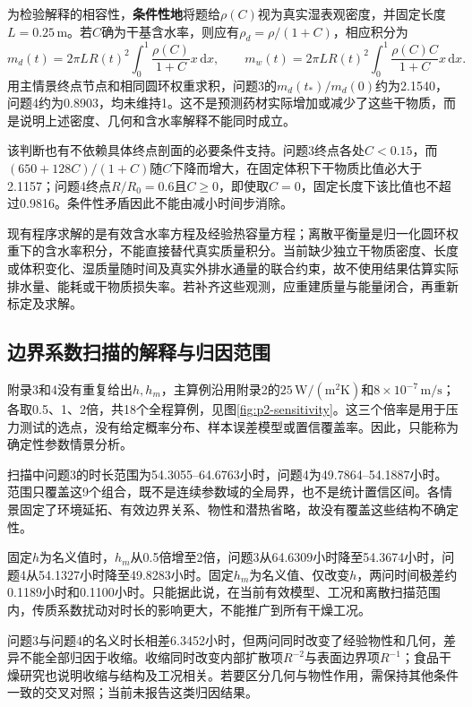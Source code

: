 \documentclass[UTF8,zihao=-4,a4paper]{ctexart}
\newcommand{\dd}{\,\mathrm d}
\begin{document}
为检验解释的相容性，\textbf{条件性地}将题给$\rho(C)$视为真实湿表观密度，并固定长度$L=0.25\,\mathrm m$。若$C$确为干基含水率，则应有$\rho_d=\rho/(1+C)$，相应积分为
\begin{equation}
m_d(t)=2\pi LR(t)^2\int_0^1\frac{\rho(C)}{1+C}x\dd x,\qquad
m_w(t)=2\pi LR(t)^2\int_0^1\frac{\rho(C)C}{1+C}x\dd x.
\end{equation}
用主情景终点节点和相同圆环权重求积，问题3的$m_d(t_*)/m_d(0)$约为2.1540，问题4约为0.8903，均未维持1。这不是预测药材实际增加或减少了这些干物质，而是说明上述密度、几何和含水率解释不能同时成立。

该判断也有不依赖具体终点剖面的必要条件支持。问题3终点各处$C<0.15$，而$(650+128C)/(1+C)$随$C$下降而增大，在固定体积下干物质比值必大于2.1157；问题4终点$R/R_0=0.6$且$C\ge0$，即使取$C=0$，固定长度下该比值也不超过0.9816。条件性矛盾因此不能由减小时间步消除。

现有程序求解的是有效含水率方程及经验热容量方程；离散平衡量是归一化圆环权重下的含水率积分，不能直接替代真实质量积分。当前缺少独立干物质密度、长度或体积变化、湿质量随时间及真实外排水通量的联合约束，故不使用结果估算实际排水量、能耗或干物质损失率。若补齐这些观测，应重建质量与能量闭合，再重新标定及求解。

\subsection{边界系数扫描的解释与归因范围}
附录3和4没有重复给出$h,h_m$，主算例沿用附录2的$25\,\mathrm{W/(m^2K)}$和$8\times10^{-7}\,\mathrm{m/s}$；各取0.5、1、2倍，共18个全程算例，见图\ref{fig:p2-sensitivity}。这三个倍率是用于压力测试的选点，没有给定概率分布、样本误差模型或置信覆盖率。因此，只能称为确定性参数情景分析。

扫描中问题3的时长范围为54.3055--64.6763小时，问题4为49.7864--54.1887小时。范围只覆盖这9个组合，既不是连续参数域的全局界，也不是统计置信区间。各情景固定了环境延拓、有效边界关系、物性和潜热省略，故没有覆盖这些结构不确定性。

固定$h$为名义值时，$h_m$从0.5倍增至2倍，问题3从64.6309小时降至54.3674小时，问题4从54.1327小时降至49.8283小时。固定$h_m$为名义值、仅改变$h$，两问时间极差约0.1189小时和0.1100小时。只能据此说，在当前有效模型、工况和离散扫描范围内，传质系数扰动对时长的影响更大，不能推广到所有干燥工况。

问题3与问题4的名义时长相差6.3452小时，但两问同时改变了经验物性和几何，差异不能全部归因于收缩。收缩同时改变内部扩散项$R^{-2}$与表面边界项$R^{-1}$；食品干燥研究也说明收缩与结构及工况相关\cite{ramallo2011,mahiuddin2018}。若要区分几何与物性作用，需保持其他条件一致的交叉对照；当前未报告这类归因结果。
\end{document}
